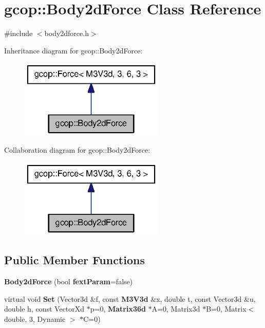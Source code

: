 \section{gcop\-:\-:\-Body2d\-Force \-Class \-Reference}
\label{classgcop_1_1Body2dForce}


{\ttfamily \#include $<$body2dforce.\-h$>$}



\-Inheritance diagram for gcop\-:\-:\-Body2d\-Force\-:\nopagebreak
\begin{figure}[H]
\begin{center}
\leavevmode
\includegraphics[width=194pt]{classgcop_1_1Body2dForce__inherit__graph}
\end{center}
\end{figure}


\-Collaboration diagram for gcop\-:\-:\-Body2d\-Force\-:\nopagebreak
\begin{figure}[H]
\begin{center}
\leavevmode
\includegraphics[width=194pt]{classgcop_1_1Body2dForce__coll__graph}
\end{center}
\end{figure}
\subsection*{\-Public \-Member \-Functions}
\begin{DoxyCompactItemize}
\item 
{\bf \-Body2d\-Force} (bool {\bf fext\-Param}=false)
\item 
virtual void {\bf \-Set} (\-Vector3d \&f, const {\bf \-M3\-V3d} \&x, double t, const \-Vector3d \&u, double h, const \-Vector\-Xd $\ast$p=0, {\bf \-Matrix36d} $\ast$\-A=0, \-Matrix3d $\ast$\-B=0, \-Matrix$<$ double, 3, \-Dynamic $>$ $\ast$\-C=0)
\end{DoxyCompactItemize}
